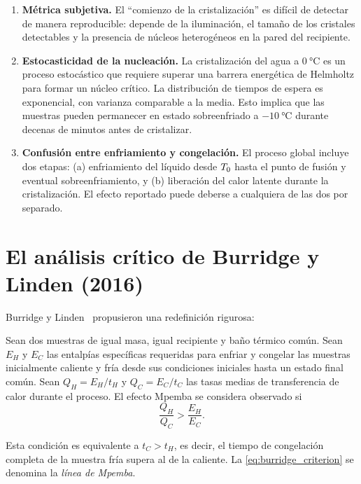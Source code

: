 \begin{enumerate}
\item \textbf{Métrica subjetiva.} El ``comienzo de la cristalización'' es difícil 
de detectar de manera reproducible: depende de la iluminación, el tamaño de los 
cristales detectables y la presencia de núcleos heterogéneos en la pared del 
recipiente.
\item \textbf{Estocasticidad de la nucleación.} La cristalización del agua a 
$\SI{0}{\celsius}$ es un proceso estocástico que requiere superar una barrera 
energética de Helmholtz para formar un núcleo crítico. La distribución de 
tiempos de espera es exponencial, con varianza comparable a la media. Esto 
implica que las muestras pueden permanecer en estado sobreenfriado a 
$\SI{-10}{\celsius}$ durante decenas de minutos antes de cristalizar.
\item \textbf{Confusión entre enfriamiento y congelación.} El proceso global 
incluye dos etapas: (a) enfriamiento del líquido desde $T_{0}$ hasta el punto 
de fusión y eventual sobreenfriamiento, y (b) liberación del calor latente 
durante la cristalización. El efecto reportado puede deberse a cualquiera de 
las dos por separado.
\end{enumerate}

\section{El análisis crítico de Burridge y Linden (2016)}

Burridge y Linden~\cite{burridge2016} propusieron una redefinición rigurosa:

\begin{definition}
\label{def:mpemba_burridge}
Sean dos muestras de igual masa, igual recipiente y baño térmico común. Sean 
$E_{H}$ y $E_{C}$ las entalpías específicas requeridas para enfriar y congelar 
las muestras inicialmente caliente y fría desde sus condiciones iniciales hasta 
un estado final común. Sean $Q_{H} = E_{H}/t_{H}$ y $Q_{C} = E_{C}/t_{C}$ las 
tasas medias de transferencia de calor durante el proceso. El efecto Mpemba 
se considera observado si
\begin{equation}
    \frac{Q_{H}}{Q_{C}} > \frac{E_{H}}{E_{C}}.
    \label{eq:burridge_criterion}
\end{equation}
\end{definition}

\noindent Esta condición es equivalente a $t_{C} > t_{H}$, es decir, el tiempo de 
congelación completa de la muestra fría supera al de la caliente. La 
\cref{eq:burridge_criterion} se denomina la \emph{línea de Mpemba}.

